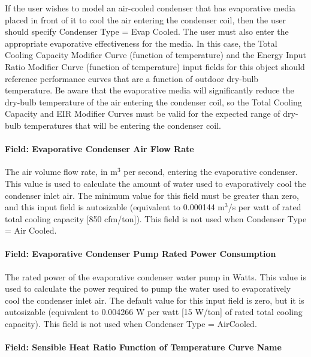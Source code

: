 If the user wishes to model an air-cooled condenser that has evaporative media placed in front of it to cool the air entering the condenser coil, then the user should specify Condenser Type = Evap Cooled. The user must also enter the appropriate evaporative effectiveness for the media. In this case, the Total Cooling Capacity Modifier Curve (function of temperature) and the Energy Input Ratio Modifier Curve (function of temperature) input fields for this object should reference performance curves that are a function of outdoor dry-bulb temperature. Be aware that the evaporative media will significantly reduce the dry-bulb temperature of the air entering the condenser coil, so the Total Cooling Capacity and EIR Modifier Curves must be valid for the expected range of dry-bulb temperatures that will be entering the condenser coil.

\paragraph{Field: Evaporative Condenser Air Flow Rate}\label{field-evaporative-condenser-air-flow-rate-1}

The air volume flow rate, in m\(^{3}\) per second, entering the evaporative condenser. This value is used to calculate the amount of water used to evaporatively cool the condenser inlet air. The minimum value for this field must be greater than zero, and this input field is autosizable (equivalent to 0.000144 m\(^{3}\)/s per watt of rated total cooling capacity {[}850 cfm/ton{]}). This field is not used when Condenser Type = Air Cooled.

\paragraph{Field: Evaporative Condenser Pump Rated Power Consumption}\label{field-evaporative-condenser-pump-rated-power-consumption-2}

The rated power of the evaporative condenser water pump in Watts. This value is used to calculate the power required to pump the water used to evaporatively cool the condenser inlet air. The default value for this input field is zero, but it is autosizable (equivalent to 0.004266 W per watt {[}15 W/ton{]} of rated total cooling capacity). This field is not used when Condenser Type = AirCooled.

\paragraph{Field: Sensible Heat Ratio Function of Temperature Curve Name}\label{field-sensible-heat-ratio-function-of-temperature-curve-name-2}

